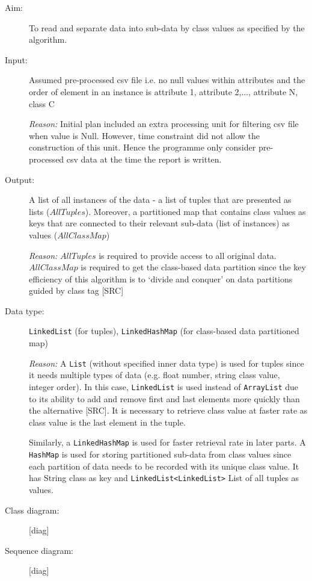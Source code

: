 \begin{description}

\item[Aim: ] To read and separate data into sub-data by class values as specified by the algorithm. 

\item[Input: ] Assumed pre-processed csv file i.e. no null values within attributes and the order of element in an instance is {attribute 1, attribute 2,..., attribute N, class C}

\textit{Reason: } Initial plan included an extra processing unit for filtering csv file when value is Null. However, time constraint did not allow the construction of this unit. Hence the programme only consider pre-processed csv data at the time the report is written.

\item[Output: ] A list of all instances of the data - a list of tuples that are presented as lists ($AllTuples$). Moreover, a partitioned map that contains class values as keys that are connected to their relevant sub-data (list of instances) as values ($AllClassMap$)
  
\textit{Reason: } $AllTuples$ is required to provide access to all original data. $AllClassMap$ is required to get the class-based data partition since the key efficiency of this algorithm is to `divide and conquer' on data partitions guided by class tag [SRC]

\item[Data type: ] \texttt{LinkedList} (for tuples), \texttt{LinkedHashMap} (for class-based data partitioned map)

\textit{Reason: } A \texttt{List} (without specified inner data type) is used for tuples since it needs multiple types of data (e.g. float number, string class value, integer order). In this case, \texttt{LinkedList} is used instead of \texttt{ArrayList} due to its ability to add and remove first and last elements more quickly than the alternative [SRC]. It is necessary to retrieve class value at faster rate as class value is the last element in the tuple.

Similarly, a \texttt{LinkedHashMap} is used for faster retrieval rate in later parts. A \texttt{HashMap} is used for storing partitioned sub-data from class values since each partition of data needs to be recorded with its unique class value. It has String class as key and \texttt{LinkedList<LinkedList>} List of all tuples as values. 

\item[Class diagram: ] [diag]

\item[Sequence diagram: ] [diag]

\end{description}




